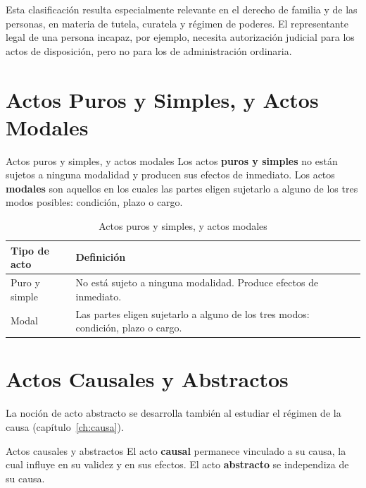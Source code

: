 \documentclass[12pt,oneside]{book}
\begin{document}
\begin{note}
Esta clasificación resulta especialmente relevante en el derecho de familia y de las personas, en materia de tutela, curatela y régimen de poderes. El representante legal de una persona incapaz, por ejemplo, necesita autorización judicial para los actos de disposición, pero no para los de administración ordinaria.
\end{note}

\section{Actos Puros y Simples, y Actos Modales}

\begin{definition}{Actos puros y simples, y actos modales}
Los actos \textbf{puros y simples} no están sujetos a ninguna modalidad y producen sus efectos de inmediato. Los actos \textbf{modales} son aquellos en los cuales las partes eligen sujetarlo a alguno de los tres modos posibles: condición, plazo o cargo.
\end{definition}

\begin{table}[H]
\centering
\begin{tabularx}{\textwidth}{l X}
\toprule
\textbf{Tipo de acto} & \textbf{Definición} \\
\midrule
Puro y simple & No está sujeto a ninguna modalidad. Produce efectos de inmediato. \\
Modal & Las partes eligen sujetarlo a alguno de los tres modos: condición, plazo o cargo. \\
\bottomrule
\end{tabularx}
\caption{Actos puros y simples, y actos modales}
\end{table}

\section{Actos Causales y Abstractos}

La noción de acto abstracto se desarrolla también al estudiar el régimen de la causa (capítulo~\ref{ch:causa}).


\begin{definition}{Actos causales y abstractos}
El acto \textbf{causal} permanece vinculado a su causa, la cual influye en su validez y en sus efectos. El acto \textbf{abstracto} se independiza de su causa.
\end{definition}
\end{document}
